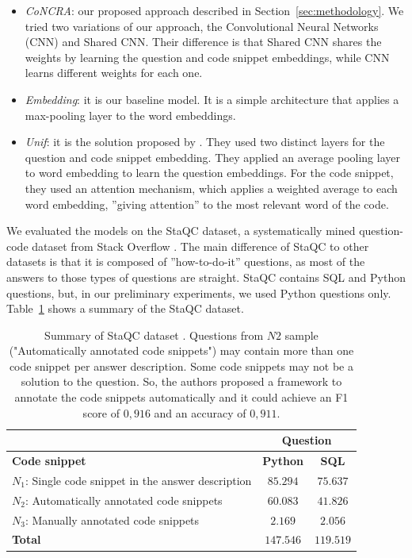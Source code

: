 \documentclass[sigconf]{acmart}
\begin{document}
\begin{itemize}
    \item \emph{CoNCRA}: our proposed approach described in Section~\ref{sec:methodology}. We tried two variations of our approach, the Convolutional Neural Networks (CNN) and Shared CNN. Their difference is that Shared CNN shares the weights by learning the question and code snippet embeddings, while CNN learns different weights for each one.
    \item \emph{Embedding}: it is our baseline model. It is a simple architecture that applies a max-pooling layer to the word embeddings. 
    \item \emph{Unif}: it is the solution proposed by \citet{cambronero-deep-code-search-2019}. They used two distinct layers for the question and code snippet embedding. They applied an average pooling layer to word embedding to learn the question embeddings. For the code snippet, they used an attention mechanism, which applies a weighted average to each word embedding, ''giving attention'' to the most relevant word of the code.
\end{itemize}




We evaluated the models on the StaQC dataset, a systematically mined question-code dataset from Stack Overflow \cite{yao-2018}. The main difference of StaQC to other datasets is that it is composed of ''how-to-do-it'' questions, as most of the answers to those types of questions are straight. StaQC contains SQL and Python questions, but, in our preliminary experiments, we used Python questions only. Table~\ref{table:summary-training-data-yao-staqc} shows a summary of the StaQC dataset.

\begin{table}[h]
\centering
\begin{tabular}{ p{5cm} c c }
\hline
  & \multicolumn{2}{c}{\textbf{Question}}\\
\hline
\textbf{Code snippet} & \textbf{Python} & \textbf{SQL}  \\
\hline

$N_{1}$: Single code snippet in the answer description & $85.294$ & $75.637$ \\

$N_{2}$: Automatically annotated code snippets & $60.083$ & $41.826$ \\

$N_{3}$: Manually annotated code snippets & $2.169$ & $2.056$  \\

 \hline
 \textbf{Total} & $\bm{147.546}$ & $\bm{119.519}$\\
 \hline 
 
\end{tabular}
\caption{Summary of StaQC dataset \cite{yao-2018}. Questions from $N2$ sample ("Automatically annotated code snippets") may contain more than one code snippet per answer description. Some code snippets may not be a solution to the question. So, the authors proposed a framework to annotate the code snippets automatically and it could achieve an F1 score of $0,916$ and an accuracy of $0,911$.}
\label{table:summary-training-data-yao-staqc}
\end{table}
\end{document}
